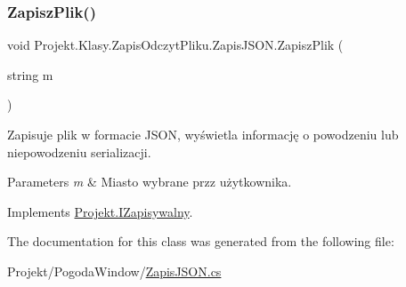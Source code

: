 \subsubsection{\texorpdfstring{ZapiszPlik()}{ZapiszPlik()}}
{\footnotesize\ttfamily void Projekt.\+Klasy.\+Zapis\+Odczyt\+Pliku.\+Zapis\+J\+S\+O\+N.\+Zapisz\+Plik (\begin{DoxyParamCaption}\item[{string}]{m }\end{DoxyParamCaption})}



Zapisuje plik w formacie J\+S\+ON, wyświetla informację o powodzeniu lub niepowodzeniu serializacji. 


\begin{DoxyParams}{Parameters}
{\em m} & Miasto wybrane przz użytkownika.\\
\hline
\end{DoxyParams}


Implements \mbox{\hyperlink{interface_projekt_1_1_i_zapisywalny_ac6d252f9fcb7128cbd5482471f541baf}{Projekt.\+I\+Zapisywalny}}.



The documentation for this class was generated from the following file\+:\begin{DoxyCompactItemize}
\item 
Projekt/\+Pogoda\+Window/\mbox{\hyperlink{_zapis_j_s_o_n_8cs}{Zapis\+J\+S\+O\+N.\+cs}}\end{DoxyCompactItemize}
